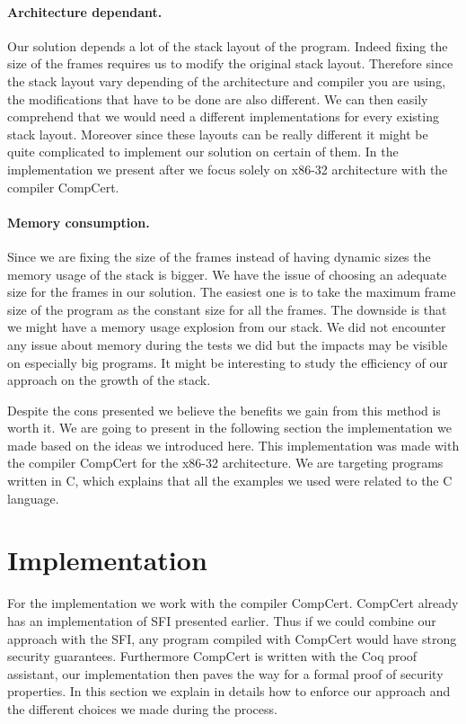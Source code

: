 \documentclass[11pt]{sdm}
\begin{document}
\paragraph{Architecture dependant.}
\label{par:Architecture dependant}
Our solution depends a lot of the stack layout of the program.
Indeed fixing the size of the frames requires us to modify the original stack layout.
Therefore since the stack layout vary depending of the architecture and compiler you are using, the modifications that have to be done are also different.
We can then easily comprehend that we would need a different implementations for every existing stack layout.
Moreover since these layouts can be really different it might be quite complicated to implement our solution on certain of them.
In the implementation we present after we focus solely on x86-32 architecture with the compiler CompCert.

\paragraph{Memory consumption.}
\label{par:Memory consumption}
Since we are fixing the size of the frames instead of having dynamic sizes the memory usage of the stack is bigger. We have the issue of choosing an adequate size for the frames in our solution. The easiest one is to take the maximum frame size of the program as the constant size for all the frames. The downside is that we might have a memory usage explosion from our stack.
We did not encounter any issue about memory during the tests we did but the impacts may be visible on especially big programs. It might be interesting to study the efficiency of our approach on the growth of the stack.

Despite the cons presented we believe the benefits we gain from this method is worth it.
We are going to present in the following section the implementation we made based on the ideas we introduced here. This implementation was made with the compiler CompCert for the x86-32 architecture. We are targeting programs written in C, which explains that all the examples we used were related to the C language.


\newpage
\section{Implementation}
\label{sec:implementation}

For the implementation we work with the compiler CompCert. CompCert already has an implementation of SFI presented earlier. Thus if we could combine our approach with the SFI, any program compiled with CompCert would have strong security guarantees. Furthermore CompCert is written with the Coq proof assistant, our implementation then paves the way for a formal proof of security properties. In this section we explain in details how to enforce our approach and the different choices we made during the process.
\end{document}
